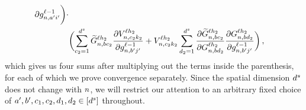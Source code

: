 \begin{align*}
\begin{aligned}[t]
{                        }{
                            \partial g_{n, a'i'}^{\ell- 1}
                        }
            \biggr)
            \cdot
            \\
            &\biggl(
                \sum_{c_2=1}^{d^s}
                    \widetilde{G}_{n, b c_2}^{\ell h_2}
                    \frac{
                        \partial
                        V_{n, c_2 k_2}^{\ell h_2}
                    }{
                        \partial g_{n, b' j'}^{\ell - 1}
                    }
                    +
                    V_{n, c_2 k_2}^{\ell h_2}
                    \sum_{d_2 = 1}^{d^s}
                        \frac{
                            \partial
                            \widetilde{G}_{n, b c_2}^{\ell h_2}
                        }{
                            \partial 
                            G_{n, b d_2}^{\ell h_2}
                        }
                        \frac{
                            \partial 
                            G_{n, b d_2}^{\ell h_2}
                        }{
                            \partial g_{n, b' j'}^{\ell - 1}
                        }
            \biggr)
            \, ,
        \end{aligned}
\end{align*}
which gives us four sums after multiplying out the terms inside the parenthesis, for each of which we prove convergence separately.
Since the spatial dimension $d^s$ does not change with $n$, we will restrict our attention to an arbitrary fixed choice of $a', b', c_1, c_2, d_1, d_2 \in [d^s]$ throughout.


